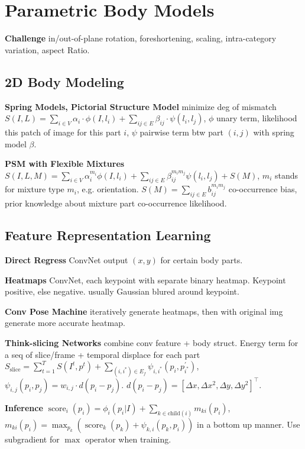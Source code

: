 \section{Parametric Body Models}
\textbf{Challenge} in/out-of-plane rotation, foreshortening, scaling, intra-category variation, aspect Ratio.

\subsection*{2D Body Modeling}

\textbf{Spring Models, Pictorial Structure Model}
% 
minimize deg of mismatch \(S(I, L)=\sum_{i \in V} \alpha_{i} \cdot \phi(I, l_{i})+\sum_{i j \in E} \beta_{i j} \cdot \psi(l_{i}, l_{j})\), \(\phi\) unary term, likelihood this patch of image for this part \(i\), \(\psi\) pairwise term btw part \((i,j)\) with spring model \(\beta\).

\textbf{PSM with Flexible Mixtures} \(S(I, L, M)=\sum_{i \in V} \alpha_{i}^{m_{i}} \phi(I, l_{i})+\sum_{i j \in E} \beta_{i j}^{m_{i} m_{j}} \psi(l_{i}, l_{j})+S(M)\), \(m_i\) stands for mixture type \(m_i\), e.g. orientation. \(S(M)=\sum_{i j \in E} b_{i j}^{m_{i} m_{j}}\) co-occurrence bias, prior knowledge about mixture part co-occurrence likelihood.

\subsection*{Feature Representation Learning}
\textbf{Direct Regress} ConvNet output \((x,y)\) for certain body parts.

\textbf{Heatmaps} ConvNet, each keypoint with separate binary heatmap. Keypoint positive, else negative. usually Gaussian blured around keypoint.

\textbf{Conv Pose Machine} iteratively generate heatmaps, then with original img generate more accurate heatmap.

\textbf{Think-slicing Networks} combine conv feature + body struct. Energy term for a seq of slice/frame + temporal displace for each part \(S_{\text {slice}} = \sum_{t=1}^{T} S(I^{t}, p^{t})+\sum_{(i, i^{*}) \in E_{f}} \psi_{i, i^{*}}(p_{i}, p_{i^{*}}^{\prime})\), \(\psi_{i, j}(p_{i}, p_{j})=w_{i, j} \cdot d(p_{i}-p_{j})\). \( d(p_{i}-p_{j})=[\Delta x, \Delta x^{2}, \Delta y, \Delta y^{2}]^{\top}\).

\textbf{Inference} \(\operatorname{score}_{i}(p_{i}) = \phi_{i}(p_{i} | I)+\sum_{k \in \text{child}(i)} m_{k i}(p_{i})\), \(m_{k i}(p_{i}) = \max _{p_{k}}(\operatorname{score}_{k}(p_{k})+\psi_{k, i}(p_{k}, p_{i}))\) in a bottom up manner. Use subgradient for \(\max\) operator when training.


